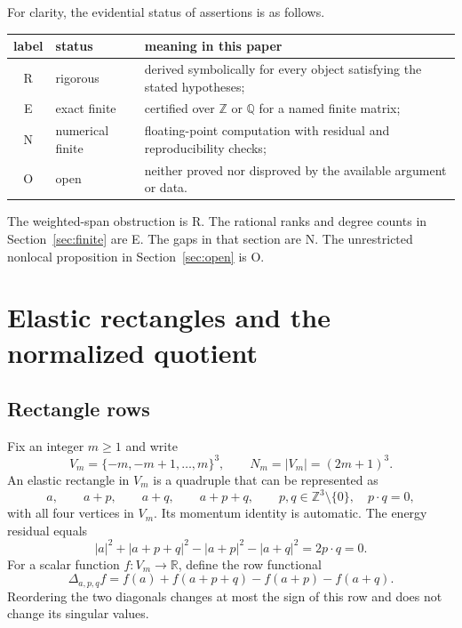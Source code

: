 \documentclass[11pt]{article}
\theoremstyle{definition}
\theoremstyle{remark}
\begin{document}
For clarity, the evidential status of assertions is as follows.
\begin{center}
\begin{tabular}{@{}clp{}@{}}
\toprule
label & status & meaning in this paper \\
\midrule
R & rigorous & derived symbolically for every object satisfying the stated hypotheses;\\
E & exact finite & certified over $\mathbb Z$ or $\mathbb Q$ for a named finite matrix;\\
N & numerical finite & floating-point computation with residual and reproducibility checks;\\
O & open & neither proved nor disproved by the available argument or data.\\
\bottomrule
\end{tabular}
\end{center}
The weighted-span obstruction is R.  The rational ranks and degree counts in
Section~\ref{sec:finite} are E.  The gaps in that section are N.  The
unrestricted nonlocal proposition in Section~\ref{sec:open} is O.

\section{Elastic rectangles and the normalized quotient}\label{sec:operator}

\subsection{Rectangle rows}

Fix an integer $m\geq1$ and write
\[
 V_m=\{-m,-m+1,\ldots,m\}^3,\qquad N_m=|V_m|=(2m+1)^3.
\]
An elastic rectangle in $V_m$ is a quadruple that can be represented as
\begin{equation}\label{eq:rectangle}
 a,\qquad a+p,\qquad a+q,\qquad a+p+q,
 \qquad p,q\in\mathbb Z^3\setminus\{0\},\quad p\cdot q=0,
\end{equation}
with all four vertices in $V_m$.  Its momentum identity is automatic.  The
energy residual equals
\[
 |a|^2+|a+p+q|^2-|a+p|^2-|a+q|^2=2p\cdot q=0.
\]
For a scalar function $f:V_m\to\mathbb R$, define the row functional
\begin{equation}\label{eq:delta}
 \Delta_{a,p,q}f
 =f(a)+f(a+p+q)-f(a+p)-f(a+q).
\end{equation}
Reordering the two diagonals changes at most the sign of this row and does
not change its singular values.
\end{document}
